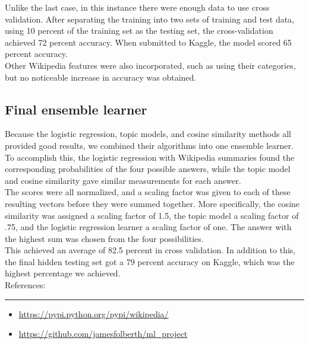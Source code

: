 \documentclass{article}
\newcommand{\problemline}{\rule{\textwidth}{0.25mm}}
\theoremstyle{mystuff}
\theoremstyle{myexample}
\theoremstyle{named}
\begin{document}
Unlike the last case, in this instance there were enough data to use cross validation.  After separating the training into two sets of training and test data, using 10 percent of the training set as the testing set, the cross-validation achieved 72 percent accuracy.  When submitted to Kaggle, the model scored 65 percent accuracy.\\

Other Wikipedia features were also incorporated, such as using their categories, but no noticeable increase in accuracy was obtained.\\
\label{ssec:log_reg}

\subsection{Final ensemble learner}
Because the logistic regression, topic models, and cosine similarity methods all provided good results, we combined their algorithms into one ensemble learner.  To accomplish this, the logistic regression with Wikipedia summaries found the corresponding probabilities of the four possible answers, while the topic model and cosine similarity gave similar measurements for each answer. \\

The scores were all normalized, and a scaling factor was given to each of these resulting vectors before they were summed together. More specifically, the cosine similarity was assigned a scaling factor of 1.5, the topic model a scaling factor of .75, and the logistic regression learner a scaling factor of one.  The answer with the highest sum was chosen from the four possibilities. \\

This achieved an average of 82.5 percent in cross validation.  In addition to this, the final hidden testing set got a 79 percent accuracy on Kaggle, which was the highest percentage we achieved. \\



References:\\
\problemline
\begin{itemize}
   \item \url{https://pypi.python.org/pypi/wikipedia/}
   \item \url{https://github.com/jamesfolberth/ml_project}
\end{itemize}

%
%
\end{document}
